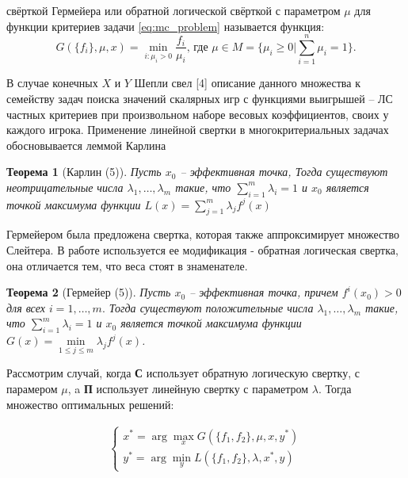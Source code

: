 \begin{flushleft}
\begin{Def}
	свёрткой Гермейера или обратной логической свёрткой с параметром $\mu$ для 
	функции критериев задачи \eqref{eq:mc_problem} называется функция:
	\begin{equation}
		G(\{f_i\}, \mu, x)=
		\min\limits_{i: \mu_i > 0} \frac{f_i}{\mu_i} \textrm{, где }
		\mu \in M =\{\mu_i \geq 0 | \sum_{i=1}^n \mu_i =1 \}.
	\end{equation}
\end{Def}

\qquad В случае конечных $X$ и $Y$ Шепли свел [4] описание данного множества к
семейству задач поиска значений скалярных игр с функциями выигрышей – 
ЛС частных критериев при произвольном наборе весовых коэффициентов, 
своих у каждого игрока. Применение линейной свертки в многокритериальных 
задачах обосновывается леммой Карлина

\newtheorem{Th}{Теорема}
\begin{Th}[Карлин (5)]
	Пусть $x_0$ – эффективная точка,
    Тогда существуют неотрицательные числа $\lambda_1,…,\lambda_m$ такие, 
    что $\sum_{i=1}^m \lambda_i=1$ и $x_0$ является точкой максимума функции  
    $L(x) =\sum_{j=1}^m \lambda_j f^j(x)$ 
\end{Th}

\qquad Гермейером была предложена свертка, которая также аппроксимирует 
множество Слейтера. В работе используется ее модификация -
обратная логическая свертка, она отличается тем, что веса стоят в знаменателе.

\begin{Th}[Гермейер (5)]
    Пусть $x_0$ – эффективная точка, причем $f^i(x_0)>0$ для всех 
    $i=1,…,m.$
    Тогда существуют положительные числа $\lambda_1,…,\lambda_m$ такие, 
    что $\sum_{i=1}^m \lambda_i=1$ и $x_0$ является точкой максимума функции  
    $G(x) =\min \limits_{1 \leqslant j \leqslant m} \lambda_j f^j(x)$.
\end{Th}

Рассмотрим случай, когда \textbf{С} использует обратную логическую свертку,
с парамером $\mu$, a \textbf{П} использует линейную
свертку с параметром $\lambda$. Тогда множество оптимальных решений:

\begin{gather*}
	\begin{cases}
		x^*=\arg \max \limits_{x}   G(\{f_1, f_2\}, \mu, x, y^*) \\
		y^*=\arg \min \limits_{y}   L(\{f_1, f_2\}, \lambda, x^*, y)
	\end{cases}
\end{gather*}


\end{flushleft}
